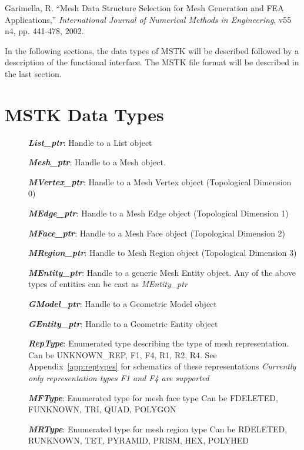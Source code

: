 \documentclass[12pt]{article}
\begin{document}
Garimella, R. ``Mesh Data Structure Selection for Mesh Generation and
FEA Applications,'' \textit{International Journal of Numerical Methods
  in Engineering}, v55 n4, pp. 441-478, 2002.

In the following sections, the data types of MSTK will be described
followed by a description of the functional interface. The MSTK file
format will be described in the last section.

\newpage
\section{MSTK Data Types}

\begin{description}
\item[]\textbf{\textit{List\_ptr}}: Handle to a List object

\item[]\textbf{\textit{Mesh\_ptr}}: Handle to a Mesh object.

\item[]\textbf{\textit{MVertex\_ptr}}: Handle to a Mesh Vertex object (Topological
Dimension 0)

\item[]\textbf{\textit{MEdge\_ptr}}: Handle to a Mesh Edge object (Topological Dimension 1)

\item[]\textbf{\textit{MFace\_ptr}}: Handle to a Mesh Face object (Topological Dimension 2)

\item[]\textbf{\textit{MRegion\_ptr}}: Handle to Mesh Region object (Topological Dimension 3)

\item[]\textbf{\textit{MEntity\_ptr}}: Handle to a generic Mesh Entity object. Any of
the above types of entities can be cast as \textit{MEntity\_ptr}

\item[]\textbf{\textit{GModel\_ptr}}: Handle to a Geometric Model object
\item[]\textbf{\textit{GEntity\_ptr}}: Handle to a Geometric Entity object

  
\item[]\textbf{\textit{RepType}}: Enumerated type describing the type
  of mesh representation.  Can be UNKNOWN\_REP, F1, F4, R1, R2, R4.
  See Appendix~\ref{app:reptypes} for schematics of these
  representations \textit{Currently only representation types F1 and
    F4 are supported}

\item[]\textbf{\textit{MFType}}: Enumerated type for mesh face type
Can be FDELETED, FUNKNOWN, TRI, QUAD, POLYGON

\item[]\textbf{\textit{MRType}}: Enumerated type for mesh region type
Can be RDELETED, RUNKNOWN, TET, PYRAMID, PRISM, HEX, POLYHED
\end{description}
\end{document}
